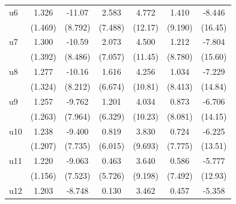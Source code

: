 \begin{table}[htbp]
\begin{tabular}{l*{6}{c}}
\addlinespace
u6                  &       1.326         &      -11.07         &       2.583         &       4.772         &       1.410         &      -8.446         \\
                    &     (1.469)         &     (8.792)         &     (7.488)         &     (12.17)         &     (9.190)         &     (16.45)         \\
\addlinespace
u7                  &       1.300         &      -10.59         &       2.073         &       4.500         &       1.212         &      -7.804         \\
                    &     (1.392)         &     (8.486)         &     (7.057)         &     (11.45)         &     (8.780)         &     (15.60)         \\
\addlinespace
u8                  &       1.277         &      -10.16         &       1.616         &       4.256         &       1.034         &      -7.229         \\
                    &     (1.324)         &     (8.212)         &     (6.674)         &     (10.81)         &     (8.413)         &     (14.84)         \\
\addlinespace
u9                  &       1.257         &      -9.762         &       1.201         &       4.034         &       0.873         &      -6.706         \\
                    &     (1.263)         &     (7.964)         &     (6.329)         &     (10.23)         &     (8.081)         &     (14.15)         \\
\addlinespace
u10                 &       1.238         &      -9.400         &       0.819         &       3.830         &       0.724         &      -6.225         \\
                    &     (1.207)         &     (7.735)         &     (6.015)         &     (9.693)         &     (7.775)         &     (13.51)         \\
\addlinespace
u11                 &       1.220         &      -9.063         &       0.463         &       3.640         &       0.586         &      -5.777         \\
                    &     (1.156)         &     (7.523)         &     (5.726)         &     (9.198)         &     (7.492)         &     (12.93)         \\
\addlinespace
u12                 &       1.203         &      -8.748         &       0.130         &       3.462         &       0.457         &      -5.358         \\

\end{tabular}
\end{table}
